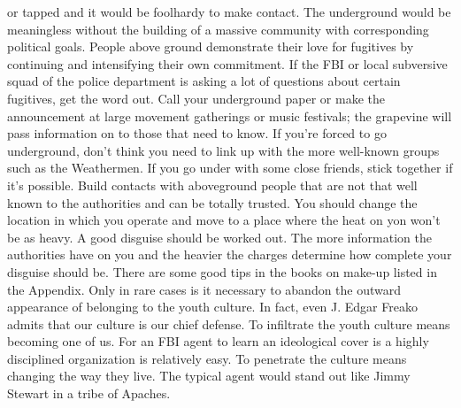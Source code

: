 \documentclass[11pt,twoside,a4paper]{book}
\begin{document}
or tapped and it would be foolhardy to make contact. The underground would be meaningless without the building of a massive community with corresponding political goals. People above ground demonstrate their love for fugitives by continuing and intensifying their own commitment. If the FBI or local subversive squad of the police department is asking a lot of questions about certain fugitives, get the word out. Call your underground paper or make the announcement at large movement gatherings or music festivals; the grapevine will pass information on to those that need to know. If you're forced to go underground, don't think you need to link up with the more well-known groups such as the Weathermen. If you go under with some close friends, stick together if it's possible. Build contacts with aboveground people that are not that well known to the authorities and can be totally trusted. You should change the location in which you operate and move to a place where the heat on yon won't be as heavy. A good disguise should be worked out. The more information the authorities have on you and the heavier the charges determine how complete your disguise should be. There are some good tips in the books on make-up listed in the Appendix. Only in rare cases is it necessary to abandon the outward appearance of belonging to the youth culture. In fact, even J. Edgar Freako admits that our culture is our chief defense. To infiltrate the youth culture means becoming one of us. For an FBI agent to learn an ideological cover is a highly disciplined organization is relatively easy. To penetrate the culture means changing the way they live. The typical agent would stand out like Jimmy Stewart in a tribe of Apaches.~\\
\end{document}
